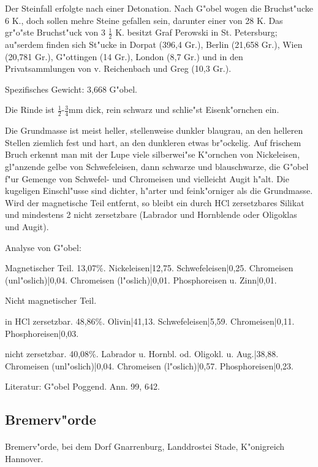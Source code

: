 \documentclass[a4paper, 11pt, oneside]{article}
\begin{document}
Der Steinfall erfolgte nach einer Detonation. Nach G"obel wogen die Bruchst"ucke 6 K., doch sollen mehre Steine gefallen sein, darunter einer von 28 K. Das gr"o"ste Bruchst"uck von 3 $\frac{1}{2}$ K. besitzt Graf Perowski in St. Petersburg; au"serdem finden sich St"ucke in Dorpat (396,4 Gr.), Berlin (21,658 Gr.), Wien (20,781 Gr.), G"ottingen (14 Gr.), London (8,7 Gr.) und in den Privatsammlungen von v. Reichenbach und Greg (10,3 Gr.).

Spezifisches Gewicht: 3,668 G"obel.

Die Rinde ist $\frac{1}{2}$-$\frac{3}{4}$mm dick, rein schwarz und schlie"st Eisenk"ornchen ein.

Die Grundmasse ist meist heller, stellenweise dunkler blaugrau, an den helleren Stellen ziemlich fest und hart, an den dunkleren etwas br"ockelig. Auf frischem Bruch erkennt man mit der Lupe viele silberwei"se K"ornchen von Nickeleisen, gl"anzende gelbe von Schwefeleisen, dann schwarze und blauschwarze, die G"obel f"ur Gemenge von Schwefel- und Chromeisen und vielleicht Augit h"alt. Die kugeligen Einschl"usse sind dichter, h"arter und feink"orniger als die Grundmasse. Wird der magnetische Teil entfernt, so bleibt ein durch HCl zersetzbares Silikat und mindestens 2 nicht zersetzbare (Labrador und Hornblende oder Oligoklas und Augit).

Analyse von G"obel:

Magnetischer Teil. 13,07\%.  
Nickeleisen|12,75.  
Schwefeleisen|0,25.  
Chromeisen (unl"oslich)|0,04.  
Chromeisen (l"oslich)|0,01.  
Phosphoreisen u. Zinn|0,01.

Nicht magnetischer Teil.

in HCl zersetzbar. 48,86\%.  
Olivin|41,13.  
Schwefeleisen|5,59.  
Chromeisen|0,11.  
Phosphoreisen|0,03.

nicht zersetzbar. 40,08\%.  
Labrador u. Hornbl. od. Oligokl. u. Aug.|38,88.  
Chromeisen (unl"oslich)|0,04.  
Chromeisen (l"oslich)|0,57.  
Phosphoreisen|0,23.  

\footnotesize
Literatur: G"obel Poggend. Ann. 99, 642.

\subsection{Bremerv"orde}
\normalsize
\paragraph{}
Bremerv"orde, bei dem Dorf Gnarrenburg, Landdrostei Stade, K"onigreich Hannover.
\end{document}
